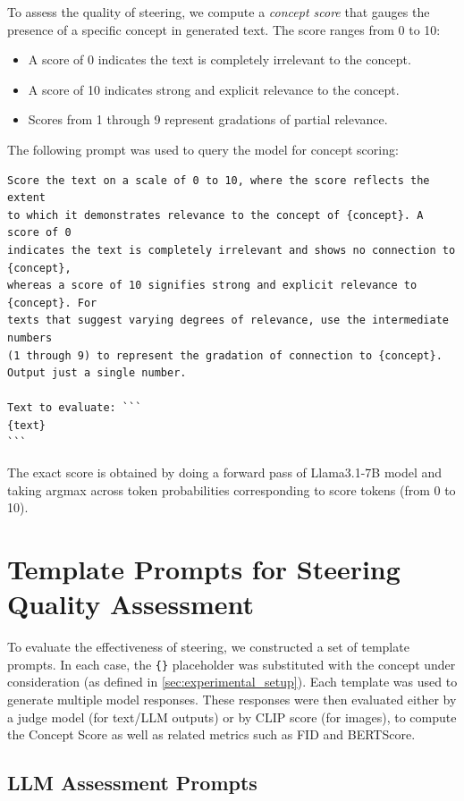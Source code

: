 To assess the quality of steering, we compute a \emph{concept score} that gauges the 
presence of a specific concept in generated text. The score ranges from 0 to 10:
\begin{itemize}
    \item A score of 0 indicates the text is completely irrelevant to the concept.
    \item A score of 10 indicates strong and explicit relevance to the concept.
    \item Scores from 1 through 9 represent gradations of partial relevance.
\end{itemize}

The following prompt was used to query the model for concept scoring:

\begin{verbatim}
Score the text on a scale of 0 to 10, where the score reflects the extent 
to which it demonstrates relevance to the concept of {concept}. A score of 0 
indicates the text is completely irrelevant and shows no connection to {concept}, 
whereas a score of 10 signifies strong and explicit relevance to {concept}. For 
texts that suggest varying degrees of relevance, use the intermediate numbers 
(1 through 9) to represent the gradation of connection to {concept}. 
Output just a single number.

Text to evaluate: ```
{text}
```

\end{verbatim}

The exact score is obtained by doing a forward pass of Llama3.1-7B model and taking argmax across token probabilities corresponding to score tokens (from 0 to 10). 

\clearpage
\section{Template Prompts for Steering Quality Assessment}
\label{sec:template_prompts}

To evaluate the effectiveness of steering, we constructed a set of template prompts. 
In each case, the \texttt{\{\}} placeholder was substituted with the concept under 
consideration (as defined in \ref{sec:experimental_setup}). Each template was used to generate multiple 
model responses. These responses were then evaluated either by a judge model 
(for text/LLM outputs) or by CLIP score (for images), to compute the Concept Score 
as well as related metrics such as FID and BERTScore.

\subsection{LLM Assessment Prompts}
\label{sec:template_prompts_llm}


